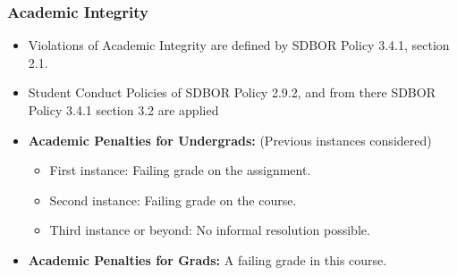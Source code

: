 \begin{frame}
  \frametitle{Academic Integrity}

  \begin{itemize}
  \item[\(\rightarrow\)] Violations of Academic Integrity are defined by SDBOR Policy 3.4.1, section 2.1.
  \item[\(\rightarrow\)] Student Conduct Policies of SDBOR Policy 2.9.2, and from there SDBOR Policy 3.4.1 section 3.2 are applied
    \vspace{1em}
  \item \textbf{Academic Penalties for Undergrads:} (Previous instances considered)
    \begin{itemize}
    \item First instance: Failing grade on the assignment.
    \item Second instance: Failing grade on the course.
    \item Third instance or beyond: No informal resolution possible.
    \end{itemize}
  \item \textbf{Academic Penalties for Grads:} A failing grade in this course.
  \end{itemize}
  
\end{frame}
